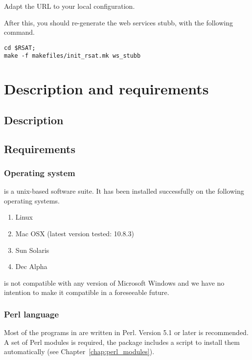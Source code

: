 \documentclass[12pt,a4paper, oneside]{scrreprt} %
\begin{document}
Adapt the URL to your local configuration.

After this, you should re-generate the web services stubb, with the
following command.

  \begin{lstlisting}
cd $RSAT; 
make -f makefiles/init_rsat.mk ws_stubb
  \end{lstlisting}



\chapter{Description and requirements}

\section{Description}


\section{Requirements}

\subsection{Operating system}

\RSAT is a unix-based software suite. It has been installed
successfully on the following operating systems.

\begin{enumerate}
\item Linux

\item Mac OSX (latest version tested: 10.8.3)

\item Sun Solaris

\item Dec Alpha

\end{enumerate}

\RSAT is not compatible with any version of Microsoft Windows and we
have no intention to make it compatible in a foreseeable future.

\subsection{Perl language}

Most of the programs in \RSAT are written in Perl. Version 5.1 or
later is recommended. A set of Perl modules is required, the \RSAT
package includes a script to install them automatically (see
Chapter~\ref{chap:perl_modules}).
\end{document}
